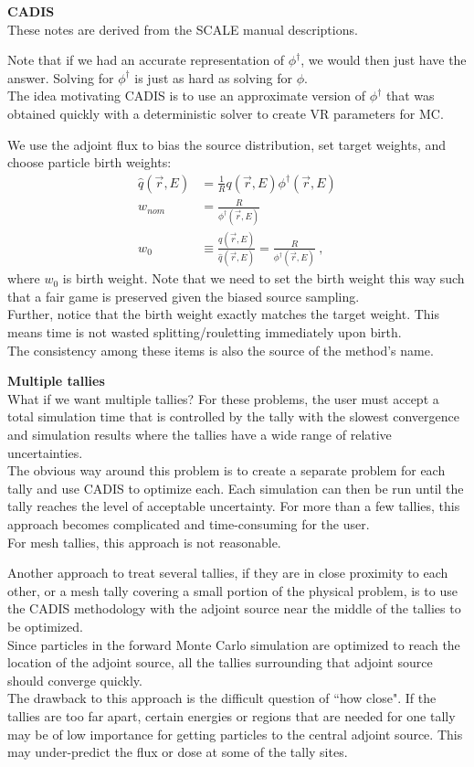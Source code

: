 \documentclass[12pt]{article}
\begin{document}
\textbf{CADIS}\\
These notes are derived from the SCALE manual descriptions. 

Note that if we had an accurate representation of $\phi^{\dagger}$, we would then just have the answer. Solving for $\phi^{\dagger}$ is just as hard as solving for $\phi$. \\
The idea motivating CADIS is to use an approximate version of $\phi^{\dagger}$ that was obtained quickly with a deterministic solver to create VR parameters for MC. 

We use the adjoint flux to bias the source distribution, set target weights, and choose particle birth weights:
\begin{align*}
\hat{q}(\vec{r}, E) &= \frac{1}{R} q(\vec{r}, E)\phi^{\dagger}(\vec{r}, E) \\
w_{nom} &= \frac{R}{\phi^{\dagger}(\vec{r}, E)}\\
w_0 &\equiv \frac{q(\vec{r}, E)}{\hat{q}(\vec{r}, E)} = \frac{R}{\phi^{\dagger}(\vec{r}, E)}\:,
\end{align*}
%
where $w_0$ is birth weight. Note that we need to set the birth weight this way such that a fair game is preserved given the biased source sampling.\\
Further, notice that the birth weight exactly matches the target weight. This means time is not wasted splitting/rouletting immediately upon birth.\\
The consistency among these items is also the source of the method's name.

\textbf{Multiple tallies}\\
What if we want multiple tallies? For these problems, the user must accept a total simulation time that is controlled by the tally with the slowest convergence and simulation results where the tallies have a wide range of relative uncertainties.\\
The obvious way around this problem is to create a separate problem for each tally and use
CADIS to optimize each. Each simulation can then be run until the tally reaches the level of acceptable uncertainty. For more than a few tallies, this approach becomes complicated and time-consuming for the user. \\
For mesh tallies, this approach is not reasonable.

Another approach to treat several tallies, if they are in close proximity to each other, or a mesh tally covering a small portion of the physical problem, is to use the CADIS methodology with the adjoint source near the middle of the tallies to be optimized.\\
Since particles in the forward Monte Carlo simulation are optimized to reach the location of the adjoint source, all the tallies surrounding that adjoint source should converge quickly. \\
The drawback to this approach is the difficult question of ``how close". If the tallies are too far apart, certain energies or regions that are needed for one tally may be of low importance for getting particles to the central adjoint source. This may under-predict the flux or dose at some of the tally sites.
\end{document}
